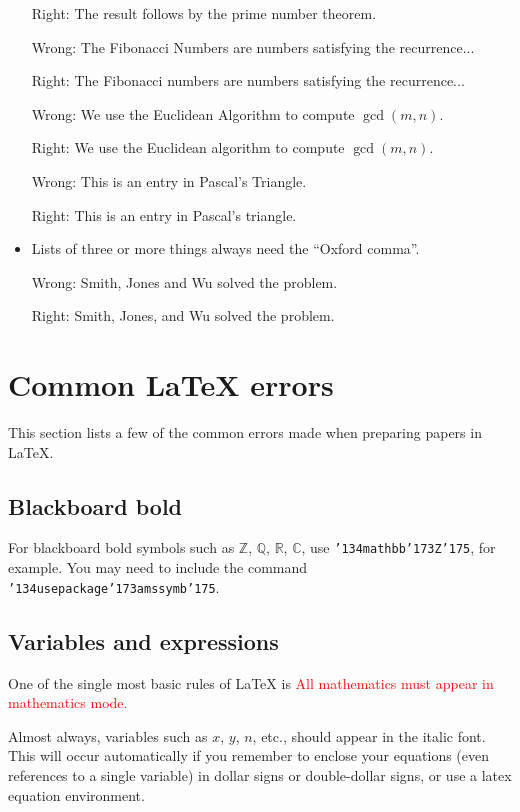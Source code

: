 \documentclass[12pt]{article}
\begin{document}
\begin{itemize}
Right:  The result follows by the prime number theorem.

Wrong:  The Fibonacci Numbers are numbers satisfying the
recurrence...

Right:  The Fibonacci numbers are numbers satisfying the
recurrence...

Wrong:  We use the Euclidean Algorithm to compute $\gcd(m,n)$.

Right:  We use the Euclidean algorithm to compute $\gcd(m,n)$.

Wrong:  This is an entry in Pascal's Triangle.

Right:  This is an entry in Pascal's triangle.

\item Lists of three or more things always need the ``Oxford comma''.

Wrong:  Smith, Jones and Wu solved the problem.

Right:  Smith, Jones, and Wu solved the problem.

\end{itemize}

\section{Common LaTeX errors}

     This section lists a few of the common errors made
when preparing papers in LaTeX.

\subsection{Blackboard bold}

     For blackboard bold symbols such as
$\mathbb Z$, $\mathbb Q$, $\mathbb R$, $\mathbb C$, use
{\tt \char'134mathbb\char'173Z\char'175}, for example.  You may need to include
the command {\tt \char'134usepackage\char'173amssymb\char'175}.

\subsection{Variables and expressions}

One of the single most basic rules of LaTeX is
	\textcolor{red}{All mathematics must appear in mathematics mode.}

     Almost always, variables such as $x$, $y$, $n$, etc., should appear
in the italic font.  This will occur automatically if you remember
to enclose your equations (even references to a single variable) in
dollar signs or double-dollar signs, or use a latex equation environment.
\end{document}
